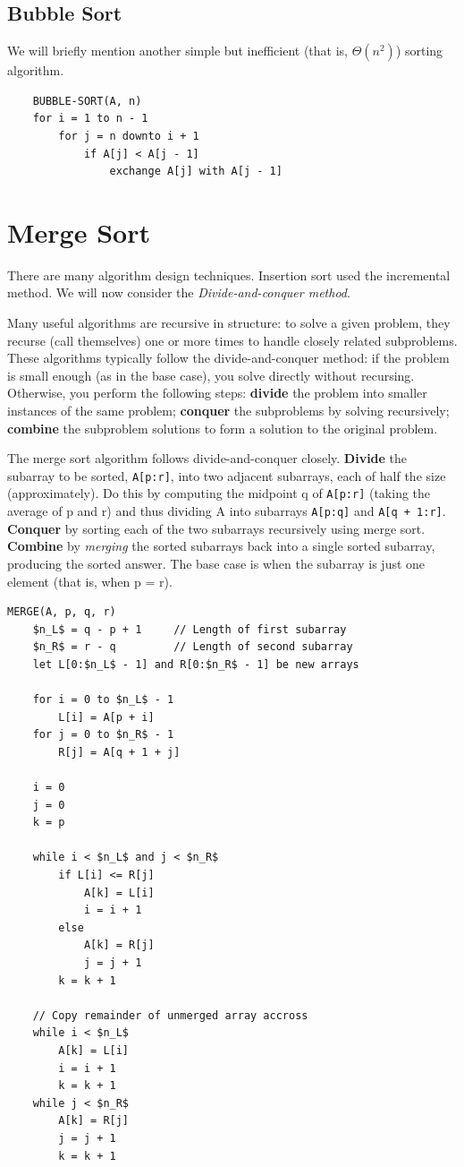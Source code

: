 \documentclass[12pt]{article}
\begin{document}
\subsection{Bubble Sort}
We will briefly mention another simple but inefficient (that is, $\Theta(n^2)$) sorting algorithm.
\begin{lstlisting}
    BUBBLE-SORT(A, n)
    for i = 1 to n - 1
        for j = n downto i + 1
            if A[j] < A[j - 1]
                exchange A[j] with A[j - 1]
\end{lstlisting}

\section{Merge Sort}
There are many algorithm design techniques. Insertion sort used the incremental method. We will now consider
the \textit{Divide-and-conquer method}.

Many useful algorithms are recursive in structure: to solve a given problem, they recurse (call themselves) one
or more times to handle closely related subproblems. These algorithms typically follow the divide-and-conquer method:
if the problem is small enough (as in the base case), you solve directly
without recursing. Otherwise, you perform the following steps: \textbf{divide} the problem into smaller instances
of the same problem; \textbf{conquer} the subproblems by solving recursively; \textbf{combine} the subproblem
solutions to form a solution to the original problem.

The merge sort algorithm follows divide-and-conquer closely. \textbf{Divide} the subarray to be sorted, \texttt{A[p:r]},
into two adjacent subarrays, each of half the size (approximately). Do this by computing the midpoint q of \texttt{A[p:r]}
(taking the average of p and r) and thus dividing A into subarrays \texttt{A[p:q]} and \texttt{A[q + 1:r]}. \textbf{Conquer} by sorting each of
the two subarrays recursively using merge sort. \textbf{Combine} by \textit{merging} the sorted subarrays back into a single sorted subarray, producing the sorted answer.
The base case is when the subarray is just one element (that is, when p = r).
\begin{lstlisting}[mathescape]
    MERGE(A, p, q, r)
    $n_L$ = q - p + 1     // Length of first subarray
    $n_R$ = r - q         // Length of second subarray
    let L[0:$n_L$ - 1] and R[0:$n_R$ - 1] be new arrays

    for i = 0 to $n_L$ - 1
        L[i] = A[p + i]
    for j = 0 to $n_R$ - 1
        R[j] = A[q + 1 + j]

    i = 0
    j = 0
    k = p

    while i < $n_L$ and j < $n_R$
        if L[i] <= R[j]
            A[k] = L[i]
            i = i + 1
        else
            A[k] = R[j]
            j = j + 1
        k = k + 1

    // Copy remainder of unmerged array accross
    while i < $n_L$
        A[k] = L[i]
        i = i + 1
        k = k + 1
    while j < $n_R$
        A[k] = R[j]
        j = j + 1
        k = k + 1
\end{lstlisting}
\end{document}
